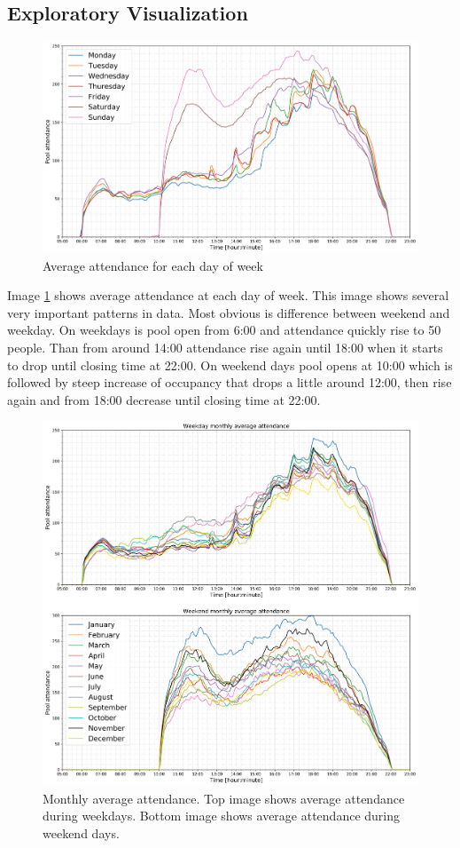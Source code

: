 \documentclass{article}
\begin{document}
\subsection{Exploratory Visualization}
\begin{figure}[h!]
\centering
\includegraphics[width=12cm]{imgs/averages}
\caption{Average attendance for each day of week}
\label{fig:averages}
\end{figure}

Image \ref{fig:averages} shows average attendance at each day of week. This image shows several very important patterns in data. Most obvious is difference between weekend and weekday. On weekdays is pool open from 6:00 and attendance quickly rise to 50 people. Than from around 14:00 attendance rise again until 18:00 when it starts to drop until closing time at 22:00. On weekend days pool opens at 10:00 which is followed by steep increase of occupancy that drops a little around 12:00, then rise again and from 18:00 decrease until closing time at 22:00.

\begin{figure}[H]
\centering
\includegraphics[width=12cm]{imgs/monthly_averages_together.png}
\caption{Monthly average attendance. Top image shows average attendance during weekdays. Bottom image shows average attendance during weekend days.}
\label{fig:monthly_averages}
\end{figure}
\end{document}
